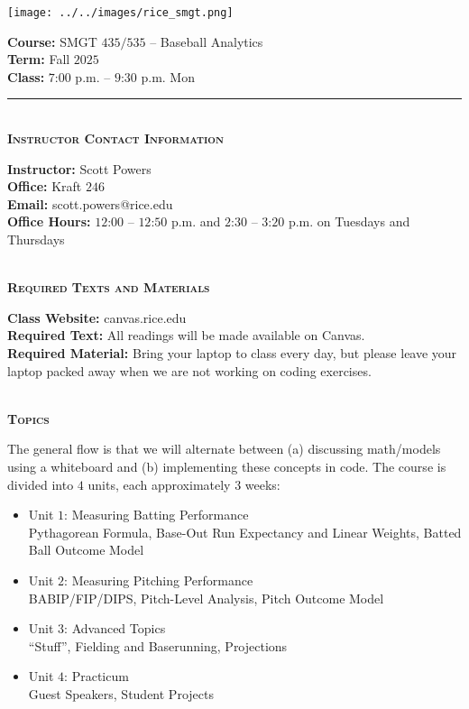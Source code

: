 \documentclass[11pt]{article}
\begin{document}
\begin{minipage}[c]{0.4\linewidth}
  \texttt{[image: ../../images/rice\_smgt.png]}
\end{minipage}
\begin{minipage}[c]{0.6\linewidth}
  \raggedleft
  {\bf Course:} SMGT $435/535$ -- Baseball Analytics\\
  {\bf Term:} Fall $2025$\\
  {\bf Class:} $7$:$00$ p.m. -- $9$:$30$ p.m. Mon
\end{minipage}

\hrule

~\\
\textbf{\textsc{Instructor Contact Information}}
\begin{adjustwidth}{1cm}{0cm}
	{\bf Instructor:} Scott Powers\\
  {\bf Office:} Kraft $246$\\
  {\bf Email:} scott.powers@rice.edu\\
  {\bf Office Hours:} $12$:$00$ -- $12$:$50$ p.m. and $2$:$30$ -- $3$:$20$ p.m. on Tuesdays and Thursdays
\end{adjustwidth}

~\\
\textbf{\textsc{Required Texts and Materials}}
\begin{adjustwidth}{1cm}{0cm}
	{\bf Class Website:} canvas.rice.edu\\
	{\bf Required Text:} All readings will be made available on Canvas.\\
	{\bf Required Material:} Bring your laptop to class every day, but please leave your laptop packed away when we are not working on coding exercises.
\end{adjustwidth}

~\\
\textbf{\textsc{Topics}}
\begin{adjustwidth}{1cm}{0cm}
  The general flow is that we will alternate between (a) discussing math/models using a whiteboard and (b) implementing these concepts in code. The course is divided into $4$ units, each approximately $3$ weeks:
  \begin{itemize}
    \item Unit $1$: Measuring Batting Performance\\
    Pythagorean Formula, Base-Out Run Expectancy and Linear Weights, Batted Ball Outcome Model
    \item Unit $2$: Measuring Pitching Performance\\
    BABIP/FIP/DIPS, Pitch-Level Analysis, Pitch Outcome Model
    \item Unit $3$: Advanced Topics\\
    ``Stuff'', Fielding and Baserunning, Projections
    \item Unit $4$: Practicum\\
    Guest Speakers, Student Projects
  \end{itemize}
\end{adjustwidth}
\end{document}
